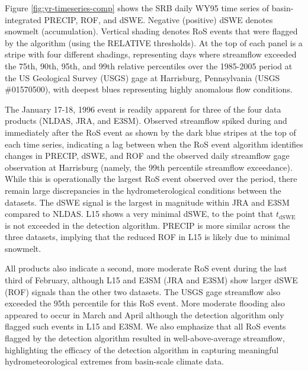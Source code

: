\documentclass[nhess, manuscript]{copernicus}
\begin{document}
Figure \ref{fig:yr-timeseries-comp} shows the SRB daily WY95 time series of basin-integrated PRECIP, ROF, and dSWE.
Negative (positive) dSWE denotes snowmelt (accumulation).
Vertical shading denotes RoS events that were flagged by the algorithm (using the RELATIVE thresholds).
At the top of each panel is a stripe with four different shadings, representing days where streamflow exceeded the 75th, 90th, 95th, and 99th relative percentiles over the 1985-2005 period at the US Geological Survey (USGS) gage at Harrisburg, Pennsylvania (USGS \#01570500), with deepest blues representing highly anomalous flow conditions.

The January 17-18, 1996 event is readily apparent for three of the four data products (NLDAS, JRA, and E3SM).
Observed streamflow spiked during and immediately after the RoS event as shown by the dark blue stripes at the top of each time series, indicating a lag between when the RoS event algorithm identifies changes in PRECIP, dSWE, and ROF and the observed daily streamflow gage observation at Harrisburg (namely, the 99th percentile streamflow exceedance).
While this is operationally the largest RoS event observed over the period, there remain large discrepancies in the hydrometerological conditions between the datasets.
The dSWE signal is the largest in magnitude within JRA and E3SM compared to NLDAS.
L15 shows a very minimal dSWE, to the point that $t_\textrm{dSWE}$ is not exceeded in the detection algorithm.
PRECIP is more similar across the three datasets, implying that the reduced ROF in L15 is likely due to minimal snowmelt.

All products also indicate a second, more moderate RoS event during the last third of February, although L15 and E3SM (JRA and E3SM) show larger dSWE (ROF) signals than the other two datasets.
The USGS gage streamflow also exceeded the 95th percentile for this RoS event.
More moderate flooding also appeared to occur in March and April although the detection algorithm only flagged such events in L15 and E3SM.
We also emphasize that all RoS events flagged by the detection algorithm resulted in well-above-average streamflow, highlighting the efficacy of the detection algorithm in capturing meaningful hydrometeorological extremes from basin-scale climate data.
\end{document}
